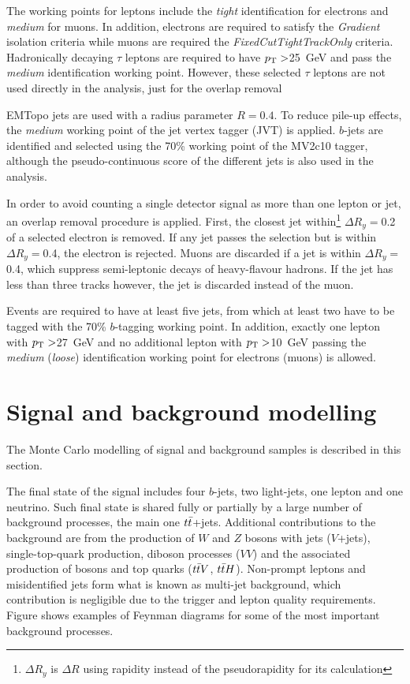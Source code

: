 The working points for leptons include the \textit{tight} identification for electrons and \textit{medium} for muons. In addition, electrons are required to satisfy the \textit{Gradient} isolation criteria while muons are required the \textit{FixedCutTightTrackOnly} criteria. Hadronically decaying $\tau$ leptons are required to have $p_{\text{T}}>$25~GeV and pass the \textit{medium} identification working point. However, these selected $\tau$ leptons are not used directly in the analysis, just for the overlap removal 

EMTopo jets are used with a radius parameter $R=0.4$. To reduce pile-up effects, the \textit{medium} working point of the jet vertex tagger (JVT) is applied. 
$b$-jets are identified and selected using the 70\% working point of the MV2c10 tagger, although the pseudo-continuous score of the different jets is also used in the analysis.

In order to avoid counting a single detector signal as more than one lepton or jet, an overlap removal procedure is applied. First, the closest jet within\footnote{$\Delta R_y$ is $\Delta R$ using rapidity instead of the pseudorapidity for its calculation} $\Delta R_y=$0.2 of a selected electron is removed. If any jet passes the selection but is within $\Delta R_y=$0.4, the electron is rejected. Muons are discarded if a jet is within $\Delta R_y=$0.4, which suppress semi-leptonic decays of heavy-flavour hadrons. If the jet has less than three tracks however, the jet is discarded instead of the muon.

Events are required to have at least five jets, from which at least two have to be tagged with the 70\% $b$-tagging working point. In addition, exactly one lepton with $p_{\text{T}}>$27~GeV and no additional lepton with $p_{\text{T}}>$10~GeV passing the \textit{medium} (\textit{loose}) identification working point for electrons (muons) is allowed.

\section{Signal and background modelling}

The Monte Carlo modelling of signal and background samples is described in this section.

The final state of the signal includes four $b$-jets, two light-jets, one lepton and one neutrino. Such final state is shared fully or partially by a large number of background processes, the main one $t\bar{t}$+jets. Additional contributions to the background are from the production of $W$ and $Z$ bosons with jets ($V$+jets), single-top-quark production, diboson processes ($VV$) and the associated production of bosons and top quarks ($t\bar{t} V$, $t\bar{t} H$). Non-prompt leptons and misidentified jets form what is known as multi-jet background, which contribution is negligible due to the trigger and lepton quality requirements. Figure shows examples of Feynman diagrams for some of the most important background processes.

